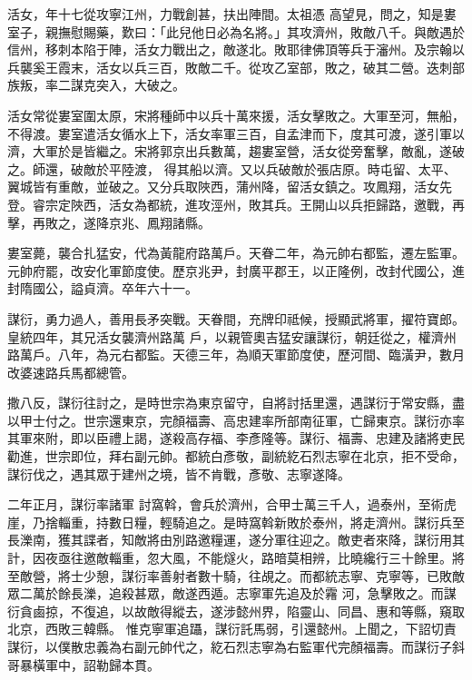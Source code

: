 \begin{pinyinscope}
 活女，年十七從攻寧江州，力戰創甚，扶出陣間。太祖憑
 高望見，問之，知是婁室子，親撫慰賜藥，歎曰：「此兒他日必為名將。」其攻濟州，敗敵八千。與敵遇於信州，移刺本陷于陣，活女力戰出之，敵遂北。敗耶律佛頂等兵于瀋州。及宗翰以兵襲奚王霞末，活女以兵三百，敗敵二千。從攻乙室部，敗之，破其二營。迭刺部族叛，率二謀克突入，大破之。



 活女常從婁室圍太原，宋將種師中以兵十萬來援，活女擊敗之。大軍至河，無船，不得渡。婁室遣活女循水上下，活女率軍三百，自孟津而下，度其可渡，遂引軍以濟，大軍於是皆繼之。宋將郭京出兵數萬，趨婁室營，活女從旁奮擊，敵亂，遂破之。師還，破敵於平陸渡，
 得其船以濟。又以兵破敵於張店原。時屯留、太平、翼城皆有重敵，並破之。又分兵取陜西，蒲州降，留活女鎮之。攻鳳翔，活女先登。睿宗定陜西，活女為都統，進攻涇州，敗其兵。王開山以兵拒歸路，邀戰，再擊，再敗之，遂降京兆、鳳翔諸縣。



 婁室薨，襲合扎猛安，代為黃龍府路萬戶。天眷二年，為元帥右都監，遷左監軍。元帥府罷，改安化軍節度使。歷京兆尹，封廣平郡王，以正隆例，改封代國公，進封隋國公，謚貞濟。卒年六十一。



 謀衍，勇力過人，善用長矛突戰。天眷間，充牌印祗候，授顯武將軍，擢符寶郎。皇統四年，其兄活女襲濟州路萬
 戶，以親管奧吉猛安讓謀衍，朝廷從之，權濟州路萬戶。八年，為元右都監。天德三年，為順天軍節度使，歷河間、臨潢尹，數月改婆速路兵馬都總管。



 撒八反，謀衍往討之，是時世宗為東京留守，自將討括里還，遇謀衍于常安縣，盡以甲士付之。世宗還東京，完顏福壽、高忠建率所部南征軍，亡歸東京。謀衍亦率其軍來附，即以臣禮上謁，遂殺高存福、李彥隆等。謀衍、福壽、忠建及諸將吏民勸進，世宗即位，拜右副元帥。都統白彥敬，副統紇石烈志寧在北京，拒不受命，謀衍伐之，遇其眾于建州之境，皆不肯戰，彥敬、志寧遂降。


二年正月，謀衍率諸軍
 討窩斡，會兵於濟州，合甲士萬三千人，過泰州，至術虎崖，乃捨輜重，持數日糧，輕騎追之。是時窩斡新敗於泰州，將走濟州。謀衍兵至長濼南，獲其諜者，知敵將由別路邀糧運，遂分軍往迎之。敵吏者來降，謀衍用其計，因夜亟往邀敵輜重，忽大風，不能燧火，路暗莫相辨，比曉纔行三十餘里。將至敵營，將士少憩，謀衍率善射者數十騎，往覘之。而都統志寧、克寧等，已敗敵眾二萬於餘長濼，追殺甚眾，敵遂西遁。志寧軍先追及於霿
 河，急擊敗之。而謀衍貪鹵掠，不復追，以故敵得縱去，遂涉懿州界，陷靈山、同昌、惠和等縣，窺取北京，西敗三韓縣。
 惟克寧軍追躡，謀衍託馬弱，引還懿州。上聞之，下詔切責謀衍，以僕散忠義為右副元帥代之，紇石烈志寧為右監軍代完顏福壽。而謀衍子斜哥暴橫軍中，詔勒歸本貫。




\end{pinyinscope}
